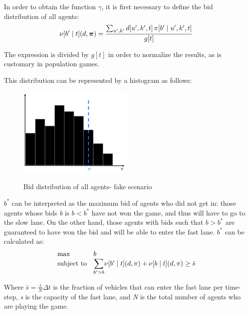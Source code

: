 \documentclass[a4paper,11pt,twoside]{book}
\begin{document}
In order to obtain the function $\gamma$, it is first necessary to define the bid distribution of all agents:
\begin{equation}
    \nu[b'\mid t](d,\bm{\pi}) = \frac{\sum_{u',k'} d[u',k',t] \, \pi[b' \mid u',k',t]}{g[t]}\\
\end{equation}

The expression is divided by $g[t]$ in order to normalize the results, as is customary in population games.

This distribution can be represented by a histogram as follows:
\begin{figure}[H]
    \centering
    \includegraphics[width=0.5\textwidth]{reporttemplate/graphics/bid_distribution.png}\\
    \caption{Bid distribution of all agents- fake scenario}\label{fig:bid_distribution}
\end{figure}

$b^*$ can be interpreted as the maximum bid of agents who did not get in: those agents whose bids \textit{b} is $b<b^*$ have not won the game, and thus will have to go to the slow lane. On the other hand, those agents with bids such that $b>b^*$ are guaranteed to have won the bid and will be able to enter the fast lane. $b^*$ can be calculated as:
\begin{equation}
    \begin{array}{ll@{}ll}
        \text{max}  & b &\\
        \text{subject to}& \displaystyle\sum\limits_{b'>b}   &\nu[b'\mid t](d,\pi) + \nu[b\mid t](d,\pi) \geq \bar{s}
    \end{array}
\end{equation}

Where \(\bar{s} = \frac{s}{N} \Delta t\) is the fraction of vehicles that can enter the fast lane per time-step, \textit{s} is the capacity of the fast lane, and \textit{N} is the total number of agents who are playing the game.
\end{document}
